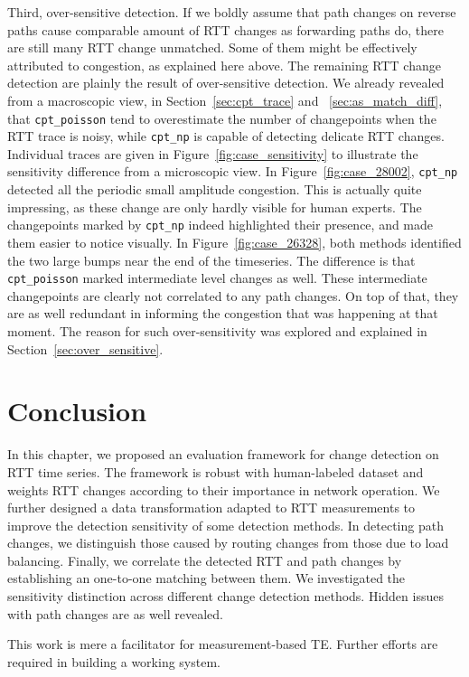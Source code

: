 Third, over-sensitive detection.
If we boldly assume that path changes on reverse paths cause comparable amount of RTT changes as forwarding paths do, there are still many RTT change unmatched.
Some of them might be effectively attributed to congestion, as explained here above.
The remaining RTT change detection are plainly the result of over-sensitive detection.
We already revealed from a macroscopic view, in Section~\ref{sec:cpt_trace} and ~\ref{sec:as_match_diff}, that \texttt{cpt\_poisson} tend to overestimate the number of changepoints when the RTT trace is noisy, while \texttt{cpt\_np} is capable of detecting delicate RTT changes. 
Individual traces are given in Figure~\ref{fig:case_sensitivity} to illustrate the sensitivity difference from a microscopic view. 
In Figure~\ref{fig:case_28002}, \texttt{cpt\_np} detected all the periodic small amplitude congestion.
This is actually quite impressing, as these change are only hardly visible for human experts.
The changepoints marked by \texttt{cpt\_np} indeed highlighted their presence, and made them easier to notice visually.
In Figure~\ref{fig:case_26328}, both methods identified the two large bumps near the end of the timeseries.
The difference is that \texttt{cpt\_poisson} marked intermediate level changes as well.
These intermediate changepoints are clearly not correlated to any path changes.
On top of that, they are as well redundant in informing the congestion that was happening at that moment.
The reason for such over-sensitivity was explored and explained in Section~\ref{sec:over_sensitive}.

\section*{Conclusion}
In this chapter, we proposed an evaluation framework for change detection on RTT time series.
The framework is robust with human-labeled dataset and weights RTT changes according to their importance in network operation. 
We further designed a data transformation adapted to RTT measurements to improve the detection sensitivity of some detection methods.
In detecting path changes, we distinguish those caused by routing changes from those due to load balancing.
Finally, we correlate the detected RTT and path changes by establishing an one-to-one matching between them. 
We investigated the sensitivity distinction across different change detection methods. 
Hidden issues with path changes are as well revealed.

This work is mere a facilitator for measurement-based TE. 
Further efforts are required in building a working system.
